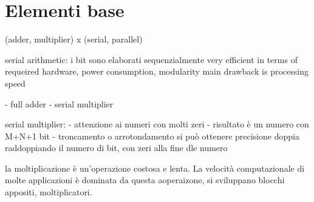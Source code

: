 \section{Elementi base}

(adder, multiplier) x (serial, parallel)

serial arithmetic:
i bit sono elaborati sequenzialmente
\cite[cap 11.1]{diniz2010} very efficient in terms of requeired hardware, power consumption, modularity
main drawback is processing speed

- full adder
- serial multiplier

serial multiplier:
- attenzione ai numeri con molti zeri
- risultato è un numero con M+N+1 bit
- troncamento o arrotondamento
si può ottenere precisione doppia raddoppiando il numero di bit, con zeri alla fine dle numero
\cite[pag. 683]{diniz2010}

la moltiplicazione è un'operazione costosa e lenta. La velocità computazionale di molte
applicazioni è dominata da questa aoperaizone, si sviluppano blocchi appositi, moltiplicatori.

\cite[11.4]{Rabaey2005}

